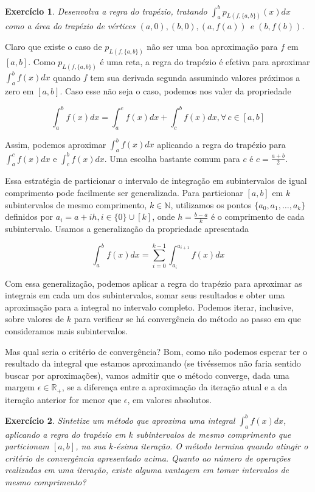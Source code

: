 \documentclass[]{article}
\newtheorem{exercicio}{Exercício}
\numberwithin{equation}{section}
\begin{document}
\begin{exercicio}
  Desenvolva a regra do trapézio, tratando
  $\int_{a}^{b} p_{L(f, \{a, b\})}(x) dx$ como a área do trapézio de
  vértices $(a, 0), (b, 0), (a, f(a))$ e $(b, f(b))$.
\end{exercicio}

Claro que existe o caso de $p_{L(f, \{a, b\})}$ não ser uma boa
aproximação para $f$ em $[a, b]$. Como $p_{L(f, \{a, b\})}$ é uma
reta, a regra do trapézio é efetiva para aproximar
$\int_{a}^{b} f(x) dx$ quando $f$ tem sua derivada segunda assumindo
valores próximos a zero em $[a, b]$. Caso esse não seja o caso,
podemos nos valer da propriedade

$$
\int_{a}^{b} f(x) dx = \int_{a}^{c} f(x) dx + \int_{c}^{b} f(x) dx, \forall\, c \in [a, b]
$$

Assim, podemos aproximar $\int_{a}^{b} f(x) dx$ aplicando a regra do
trapézio para $\int_{a}^{c} f(x) dx$ e $\int_{c}^{b} f(x) dx$. Uma
escolha bastante comum para $c$ é $c = \frac{a + b}{2}$.

Essa estratégia de particionar o intervalo de integração em
subintervalos de igual comprimento pode facilmente ser
generalizada. Para particionar $[a, b]$ em $k$ subintervalos de mesmo
comprimento, $k \in \mathbb{N}$, utilizamos os pontos
$\{a_0, a_1, \dots, a_k\}$ definidos por
$a_i = a + ih, i \in \{0\} \cup [k]$, onde $h = \frac{b - a}{k}$ é o
comprimento de cada subintervalo. Usamos a generalização da
propriedade apresentada

$$
\int_{a}^{b} f(x) dx = \sum_{i = 0}^{k - 1} \int_{a_i}^{a_{i + 1}} f(x) dx
$$

Com essa generalização, podemos aplicar a regra do trapézio para
aproximar as integrais em cada um dos subintervalos, somar seus
resultados e obter uma aproximação para a integral no intervalo
completo. Podemos iterar, inclusive, sobre valores de $k$ para
verificar se há convergência do método ao passo em que consideramos
mais subintervalos.

Mas qual seria o critério de convergência? Bom, como não podemos
esperar ter o resultado da integral que estamos aproximando (se
tivéssemos não faria sentido buscar por aproximações), vamos admitir
que o método converge, dada uma margem $\epsilon \in \mathbb{R}_+$, se
a diferença entre a aproximação da iteração atual e a da iteração
anterior for menor que $\epsilon$, em valores absolutos.

\begin{exercicio} \label{exercicioRegraTrapezioImplementacao}
  Sintetize um método que aproxima uma integral
  $\int_{a}^{b} f(x) dx$, aplicando a regra do trapézio em $k$
  subintervalos de mesmo comprimento que particionam $[a, b]$, na sua
  $k$-ésima iteração. O método termina quando atingir o critério de
  convergência apresentado acima. Quanto ao número de operações
  realizadas em uma iteração, existe alguma vantagem em tomar
  intervalos de mesmo comprimento?
\end{exercicio}
\end{document}
